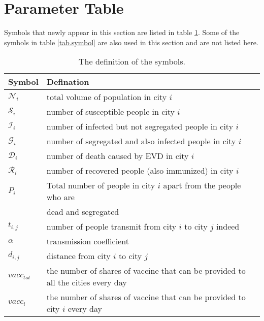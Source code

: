 \section{Parameter Table}
Symbols that newly appear in this section are listed in table \ref{tab.symbol2}. Some of the symbols in table \ref{tab.symbol} are also used in this section and are not listed here.
\begin{table}[htbp]
             \centering
                \begin{tabular}{|l|l|}
                \hline
                Symbol & Defination \\
                \hline
                 $\mathcal{N}_i$ & total volume of population in city $i$\\

                $\mathcal{S}_i$ & number of susceptible people in city $i$\\

                $\mathcal{I}_i$ & number of infected but not segregated people in city $i$\\

                $\mathcal{G}_i$ & number of segregated and also infected people in city $i$\\

                $\mathcal{D}_i$ & number of death caused by EVD in city $i$\\

                $\mathcal{R}_i$ & number of recovered people (also immunized) in city $i$\\
                
                \textbf{$P_{i}$} & Total number of people in city $i$ apart from the people who are \\ & dead and segregated \\

                \textbf{$t_{i,j}$} & number of people transmit from city $i$ to city $j$ indeed \\

                \textbf{$\alpha$} & transmission coefficient \\

                \textbf{$d_{i,j}$} & distance from city $i$ to city $j$ \\
                
                $vacc_{tot}$ & the number of shares of vaccine that can be provided to all the cities every day\\
                
                $vacc_{i}$ & the number of shares of vaccine that can be provided to city $i$ every day\\
                \hline
                \end{tabular}
                \caption{The definition of the symbols.}  \label{tab.symbol2}
\end{table}


